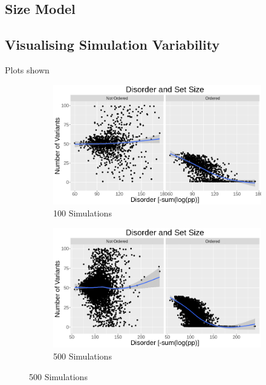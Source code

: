 \subsection{Size Model }






\subsection{Visualising Simulation Variability}
Plots shown 

\begin{figure}[H]
    \caption {Size and Disorder in Varying Number of Simulations}    
    \begin{subfigure}[H]{\textwidth}
        \centering
        \includegraphics[width=\textwidth]{images/Size_and_Disorder_Charts/100_sim.png}
        \caption{100 Simulations}
        \label{}
    \end{subfigure}
    \hfill
    
    
    \begin{subfigure}[H]{\textwidth}
        \centering
        \includegraphics[width=\textwidth]{images/Size_and_Disorder_Charts/500_sim.png}
        \caption{500 Simulations}
        \label{}
    \end{subfigure}
    
\end{figure}
    
